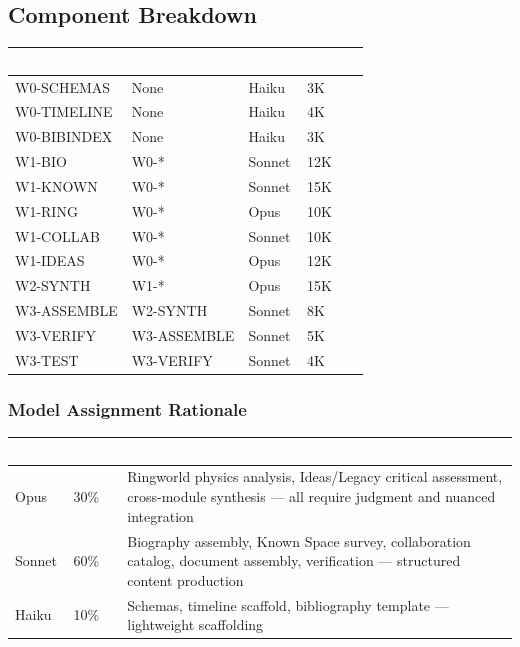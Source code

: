 \documentclass[11pt,letterpaper]{article}
\newcommand{\tableheader}[1]{\textbf{\sffamily\textcolor{white}{#1}}}
\begin{document}
\subsection{Component Breakdown}

\begin{center}
\begin{tabularx}{\textwidth}{L{2.5cm}L{2cm}C{1.5cm}C{1.5cm}}
\toprule
{}
\tableheader{Component} & \tableheader{Dependencies} & \tableheader{Model} & \tableheader{Tokens} \\
\midrule
W0-SCHEMAS & None & Haiku & 3K \\
W0-TIMELINE & None & Haiku & 4K \\
W0-BIBINDEX & None & Haiku & 3K \\
W1-BIO & W0-* & Sonnet & 12K \\
W1-KNOWN & W0-* & Sonnet & 15K \\
W1-RING & W0-* & Opus & 10K \\
W1-COLLAB & W0-* & Sonnet & 10K \\
W1-IDEAS & W0-* & Opus & 12K \\
W2-SYNTH & W1-* & Opus & 15K \\
W3-ASSEMBLE & W2-SYNTH & Sonnet & 8K \\
W3-VERIFY & W3-ASSEMBLE & Sonnet & 5K \\
W3-TEST & W3-VERIFY & Sonnet & 4K \\
\bottomrule
\end{tabularx}
\end{center}

\subsubsection{Model Assignment Rationale}

\begin{center}
\begin{tabularx}{\textwidth}{C{1.5cm}C{1.5cm}X}
\toprule
{}
\tableheader{Model} & \tableheader{Share} & \tableheader{Rationale} \\
\midrule
Opus & 30\% & Ringworld physics analysis, Ideas/Legacy critical assessment, cross-module synthesis --- all require judgment and nuanced integration \\
Sonnet & 60\% & Biography assembly, Known Space survey, collaboration catalog, document assembly, verification --- structured content production \\
Haiku & 10\% & Schemas, timeline scaffold, bibliography template --- lightweight scaffolding \\
\bottomrule
\end{tabularx}
\end{center}
\end{document}
